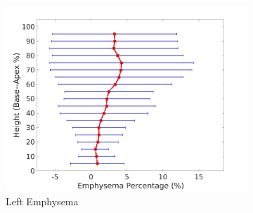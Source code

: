 \begin{figure}[H]
\begin{subfigure}{.42\linewidth}
  \includegraphics[width=\linewidth,trim={{.0\wd0} {.0\wd0} {.0\wd0} {.0\wd0}},clip]{QuantitativeAnalysis/Image/LeftLungEmphysemaDiseaseAgainstHeight.jpg} %
  \caption{Left Emphysema}
  \label{fig:DiseaseAgainstHeight-g} 
\end{subfigure} 
\begin{subfigure}{.42\linewidth}%

\end{subfigure}
\end{figure}
